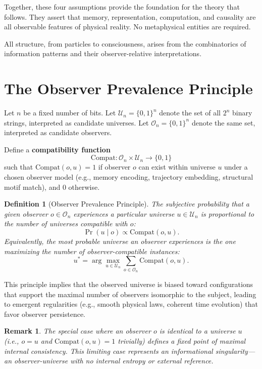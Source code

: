 \documentclass[12pt]{article}
\newtheorem{definition}{Definition}
\newtheorem{remark}{Remark}
\begin{document}
Together, these four assumptions provide the foundation for the theory that follows. They assert that memory, representation, computation, and causality are all observable features of physical reality. No metaphysical entities are required.

All structure, from particles to consciousness, arises from the combinatorics of information patterns and their observer-relative interpretations.





\section*{The Observer Prevalence Principle}

Let $n$ be a fixed number of bits. Let $\mathcal{U}_n = \{0,1\}^n$ denote the set of all $2^n$ binary strings, interpreted as candidate universes. Let $\mathcal{O}_n = \{0,1\}^n$ denote the same set, interpreted as candidate observers.

Define a \textbf{compatibility function}
\[
    \mathrm{Compat}: \mathcal{O}_n \times \mathcal{U}_n \rightarrow \{0,1\}
\]
such that $\mathrm{Compat}(o, u) = 1$ if observer $o$ can exist within universe $u$ under a chosen observer model (e.g., memory encoding, trajectory embedding, structural motif match), and 0 otherwise.

\begin{definition}[Observer Prevalence Principle]
    The \emph{subjective probability} that a given observer $o \in \mathcal{O}_n$ experiences a particular universe $u \in \mathcal{U}_n$ is proportional to the number of universes compatible with $o$:
    \[
        \Pr(u \mid o) \propto \mathrm{Compat}(o, u).
    \]
    Equivalently, the most probable universe an observer experiences is the one maximizing the number of observer-compatible instances:
    \[
        u^* = \arg\max_{u \in \mathcal{U}_n} \sum_{o \in \mathcal{O}_n} \mathrm{Compat}(o, u).
    \]
\end{definition}

This principle implies that the observed universe is biased toward configurations that support the maximal number of observers isomorphic to the subject, leading to emergent regularities (e.g., smooth physical laws, coherent time evolution) that favor observer persistence.

\begin{remark}
    The special case where an observer $o$ is identical to a universe $u$ (i.e., $o = u$ and $\mathrm{Compat}(o, u) = 1$ trivially) defines a fixed point of maximal internal consistency. This limiting case represents an informational singularity—an observer-universe with no internal entropy or external reference.
\end{remark}
\end{document}
